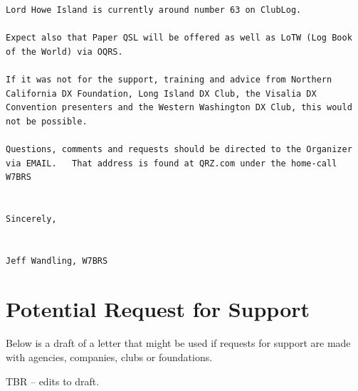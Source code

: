 \documentclass[11pt]{article}
\begin{document}
\begin{Verbatim}[fontsize=\small]
Lord Howe Island is currently around number 63 on ClubLog.

Expect also that Paper QSL will be offered as well as LoTW (Log Book
of the World) via OQRS.

If it was not for the support, training and advice from Northern 
California DX Foundation, Long Island DX Club, the Visalia DX 
Convention presenters and the Western Washington DX Club, this would 
not be possible.

Questions, comments and requests should be directed to the Organizer
via EMAIL.   That address is found at QRZ.com under the home-call
W7BRS


Sincerely,


Jeff Wandling, W7BRS
\end{Verbatim}

\section{Potential Request for Support}

Below is a draft of a letter that might be used if
requests for support are made with agencies, companies,
clubs or foundations.

\par
TBR -- edits to draft.
\par
\end{document}
